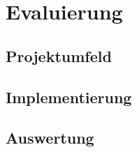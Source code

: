 \section{Evaluierung}
\subsection{Projektumfeld}

\subsection{Implementierung}

\subsection{Auswertung}